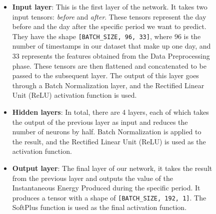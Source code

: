 \begin{figure}[H]
	\begin{minipage}{0.6\textwidth}
		\begin{itemize}
			\item \textbf{Input layer}: This is the first layer of the network.
			      It takes two input tensors: \textit{before} and \textit{after}.
			      These tensors represent the day before and the day after the specific period we want to
			      predict. They have the shape \verb|[BATCH_SIZE, 96, 33]|, where 96 is the number
			      of timestamps in our dataset that make up one day, and 33 represents the
			      features obtained from the Data Preprocessing phase.
			      These tensors are then flattened and concatenated to be passed to the subsequent layer.
			      The output of this layer goes through a Batch Normalization layer, and the
			      Rectified Linear Unit (ReLU) activation function is used.


			\item \textbf{Hidden layers}: In total, there are 4 layers, each of which takes the
			      output of the previous layer as input and reduces the number of neurons by half.
			      Batch Normalization is applied to the result, and the Rectified Linear Unit (ReLU)
			      is used as the activation function.


			\item \textbf{Output layer}: The final layer of our network, it takes the result from the
			      previous layer and outputs the value of the Instantaneous Energy Produced
			      during the specific period.
			      It produces a tensor with a shape of \verb|[BATCH_SIZE, 192, 1]|.
			      The SoftPlus function is used as the final activation function.


\end{itemize}
\end{minipage}
\end{figure}
